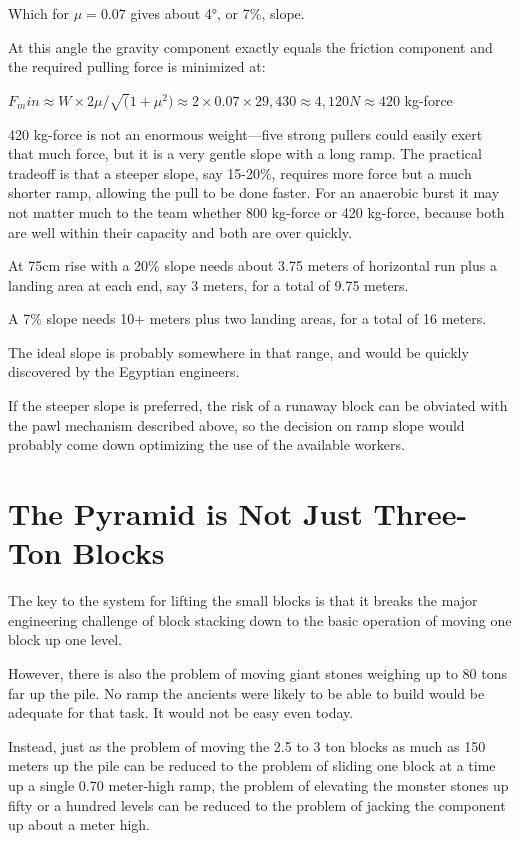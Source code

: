 \documentclass[letterpaper,11pt]{article}
\begin{document}
Which for $\mu = 0.07$ gives about 4°, or 7\%, slope. 

At this angle the gravity component exactly equals the friction component and the required pulling force is minimized at:

\vspace{10pt}
	$F_min \approx W × 2\mu / \sqrt(1 + {\mu}^2) \approx 2 × 0.07 × 29,430 \approx 4,120 N \approx 420$ kg-force
\vspace{10pt}

420 kg-force is not an enormous weight---five strong pullers could easily exert that much force, but it is a very gentle slope with a long ramp. 
The practical tradeoff is that a steeper slope, say 15-20\%, requires more force but a much shorter ramp, allowing the pull to be done faster.  
For an anaerobic burst it may not matter much to the team whether 800 kg-force or 420 kg-force, because both are well within their capacity and both are over quickly.

At 75cm rise with a 20\% slope needs about 3.75 meters of horizontal run plus a landing area at each end, say 3 meters, for a total of 9.75 meters.

A 7\% slope needs 10+ meters plus two landing areas, for a total of 16 meters.

The ideal slope is probably somewhere in that range, and would be quickly discovered by the Egyptian engineers. 

If the steeper slope is preferred, the risk of a runaway block can be obviated with the pawl mechanism described above, 
so the decision on ramp slope would probably come down optimizing the use of the available workers.



\section{The Pyramid is Not Just Three-Ton Blocks  }

The key to the system for lifting the small blocks is that it breaks the major engineering challenge of block stacking down to the basic operation 
of moving one block up one level. 

However, there is also the problem of moving giant stones weighing up to 80 tons far up the pile. 
No ramp the ancients were likely to be able to build would be adequate for that task. 
It would not be easy even today.

Instead, just as the problem of moving the 2.5 to 3 ton blocks as much as 150 meters up the pile can be reduced to the problem of sliding one block at a 
time up a single 0.70 meter-high ramp, the problem of elevating the monster stones up fifty or a hundred levels can be reduced to the problem of 
jacking the component up about a meter high. 
\end{document}
